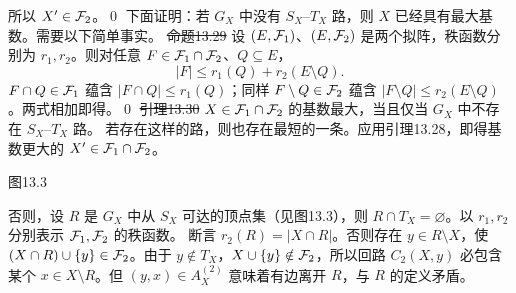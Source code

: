 所以 $X'\in\mathcal F_2$。\qed
下面证明：若 $G_X$ 中没有 $S_X$--$T_X$ 路，则 $X$ 已经具有最大基数。需要以下简单事实。
\st{命题13.29} 设 $(E,\mathcal F_1)$、$(E,\mathcal F_2)$ 是两个拟阵，秩函数分别为 $r_1,r_2$。则对任意 $F\in\mathcal F_1\cap\mathcal F_2$、$Q\subseteq E$，
\[|F|\le r_1(Q)+r_2(E\setminus Q).\]
\pr $F\cap Q\in\mathcal F_1$ 蕴含 $|F\cap Q|\le r_1(Q)$；同样 $F\setminus Q\in\mathcal F_2$ 蕴含 $|F\setminus Q|\le r_2(E\setminus Q)$。两式相加即得。\qed
\st{引理13.30} $X\in\mathcal F_1\cap\mathcal F_2$ 的基数最大，当且仅当 $G_X$ 中不存在 $S_X$--$T_X$ 路。
\pr 若存在这样的路，则也存在最短的一条。应用引理13.28，即得基数更大的 $X'\in\mathcal F_1\cap\mathcal F_2$。
\begin{center}
\par\small 图13.3
\end{center}
否则，设 $R$ 是 $G_X$ 中从 $S_X$ 可达的顶点集（见图13.3），则 $R\cap T_X=\varnothing$。以 $r_1,r_2$ 分别表示 $\mathcal F_1,\mathcal F_2$ 的秩函数。
断言 $r_2(R)=|X\cap R|$。否则存在 $y\in R\setminus X$，使 $(X\cap R)\cup\{y\}\in\mathcal F_2$。由于 $y\notin T_X$，$X\cup\{y\}\notin\mathcal F_2$，所以回路 $C_2(X,y)$ 必包含某个 $x\in X\setminus R$。但 $(y,x)\in A_X^{(2)}$ 意味着有边离开 $R$，与 $R$ 的定义矛盾。

